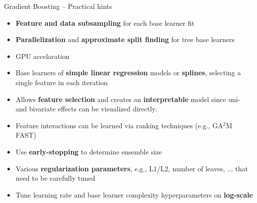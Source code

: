 \begin{frame}{Gradient Boosting -- Practical hints}

\footnotesize


\begin{itemize}
  \item \textbf{Feature and data subsampling} for each base learner fit
  \item \textbf{Parallelization} and \textbf{approximate split finding} for tree base learners
  \item GPU accelaration
\end{itemize}

\medskip

\begin{itemize}
    \item Base learners of \textbf{simple linear regression} models or \textbf{splines}, selecting a single feature in each iteration
    \item Allows \textbf{feature selection} and creates an \textbf{interpretable} model since uni- and bivariate effects can be visualized directly.
    \item Feature interactions can be learned via ranking techniques (e.g., GA$^2$M FAST)
\end{itemize}

\medskip

\begin{itemize}
    \item Use \textbf{early-stopping} to determine ensemble size
    \item Various \textbf{regularization parameters}, e.g., L1/L2, number of leaves, ... that need to be carefully tuned
    \item Tune learning rate and base learner complexity hyperparameters on \textbf{log-scale}
\end{itemize}

\end{frame}

